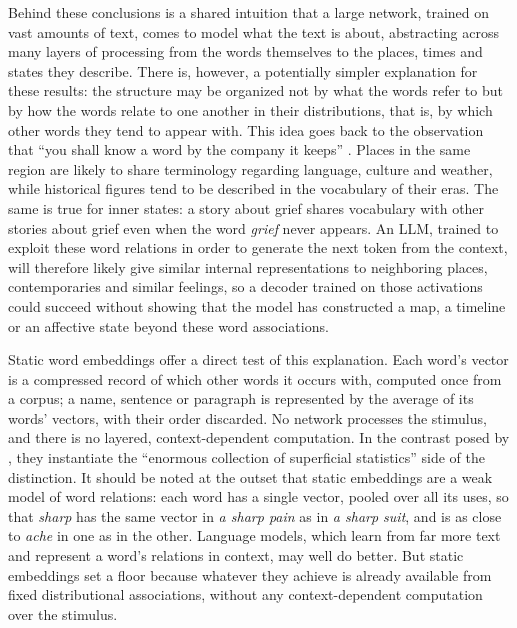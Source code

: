 \documentclass[11pt]{article}
\begin{document}
Behind these conclusions is a shared intuition that a large network, trained on vast amounts of text, comes to model what the text is about, abstracting across many layers of processing from the words themselves to the places, times and states they describe. There is, however, a potentially simpler explanation for these results: the structure may be organized not by what the words refer to but by how the words relate to one another in their distributions, that is, by which other words they tend to appear with. This idea goes back to the observation that ``you shall know a word by the company it keeps'' \citep[p.~11]{firth1957synopsis}. Places in the same region are likely to share terminology regarding language, culture and weather, while historical figures tend to be described in the vocabulary of their eras. The same is true for inner states: a story about grief shares vocabulary with other stories about grief even when the word \emph{grief} never appears. An LLM, trained to exploit these word relations in order to generate the next token from the context, will therefore likely give similar internal representations to neighboring places, contemporaries and similar feelings, so a decoder trained on those activations could succeed without showing that the model has constructed a map, a timeline or an affective state beyond these word associations.

Static word embeddings offer a direct test of this explanation. Each word's vector is a compressed record of which other words it occurs with, computed once from a corpus; a name, sentence or paragraph is represented by the average of its words' vectors, with their order discarded. No network processes the stimulus, and there is no layered, context-dependent computation. In the contrast posed by \citet{gurnee2024language}, they instantiate the ``enormous collection of superficial statistics'' side of the distinction. It should be noted at the outset that static embeddings are a weak model of word relations: each word has a single vector, pooled over all its uses, so that \emph{sharp} has the same vector in \emph{a sharp pain} as in \emph{a sharp suit}, and is as close to \emph{ache} in one as in the other. Language models, which learn from far more text and represent a word's relations in context, may well do better. But static embeddings set a floor because whatever they achieve is already available from fixed distributional associations, without any context-dependent computation over the stimulus.
\end{document}
